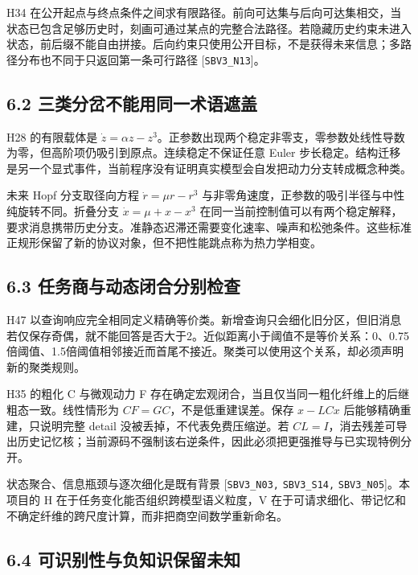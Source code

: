 \documentclass[
  10pt,
]{article}
\begin{document}
H34
在公开起点与终点条件之间求有限路径。前向可达集与后向可达集相交，当状态已包含足够历史时，刻画可通过某点的完整合法路径。若隐藏历史约束未进入状态，前后缀不能自由拼接。后向约束只使用公开目标，不是获得未来信息；多路径分布也不同于只返回第一条可行路径
{[}\nolinkurl{SBV3_N13}{]}。

\subsection{6.2
三类分岔不能用同一术语遮盖}\label{ux4e09ux7c7bux5206ux5c94ux4e0dux80fdux7528ux540cux4e00ux672fux8bedux906eux76d6}

H28 的有限载体是
\(\dot z=\alpha z-z^3\)。正参数出现两个稳定非零支，零参数处线性导数为零，但高阶项仍吸引到原点。连续稳定不保证任意
Euler
步长稳定。结构迁移是另一个显式事件，当前程序没有证明真实模型会自发把动力分支转成概念种类。

未来 Hopf 分支取径向方程 \(\dot r=\mu r-r^3\)
与非零角速度，正参数的吸引半径与中性纯旋转不同。折叠分支
\(\dot x=\mu+x-x^3\)
在同一当前控制值可以有两个稳定解释，要求消息携带历史分支。准静态迟滞还需要变化速率、噪声和松弛条件。这些标准正规形保留了新的协议对象，但不把性能跳点称为热力学相变。

\subsection{6.3
任务商与动态闭合分别检查}\label{ux4efbux52a1ux5546ux4e0eux52a8ux6001ux95edux5408ux5206ux522bux68c0ux67e5}

H47
以查询响应完全相同定义精确等价类。新增查询只会细化旧分区，但旧消息若仅保存奇偶，就不能回答是否大于2。近似距离小于阈值不是等价关系：0、0.75倍阈值、1.5倍阈值相邻接近而首尾不接近。聚类可以使用这个关系，却必须声明新的聚类规则。

H35 的粗化 C 与微观动力 F
存在确定宏观闭合，当且仅当同一粗化纤维上的后继粗态一致。线性情形为
\(CF=GC\)，不是低重建误差。保存 \(x-LCx\) 后能够精确重建，只说明完整
detail 没被丢掉，不代表免费压缩逆。若
\(CL=I\)，消去残差可导出历史记忆核；当前源码不强制该右逆条件，因此必须把更强推导与已实现特例分开。

状态聚合、信息瓶颈与逐次细化是既有背景 {[}\nolinkurl{SBV3_N03,}
\nolinkurl{SBV3_S14,} \nolinkurl{SBV3_N05}{]}。本项目的 H
在于任务变化能否组织跨模型语义粒度，V
在于可请求细化、带记忆和不确定纤维的跨尺度计算，而非把商空间数学重新命名。

\subsection{6.4
可识别性与负知识保留未知}\label{ux53efux8bc6ux522bux6027ux4e0eux8d1fux77e5ux8bc6ux4fddux7559ux672aux77e5}
\end{document}
